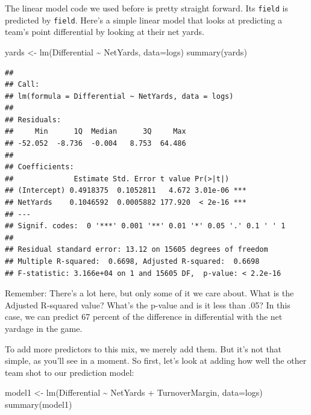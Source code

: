 \documentclass[
]{book}
\newenvironment{Shaded}{\begin{snugshade}}{\end{snugshade}}
\newcommand{\AttributeTok}[1]{\textcolor[rgb]{0.77,0.63,0.00}{#1}}
\newcommand{\FunctionTok}[1]{\textcolor[rgb]{0.00,0.00,0.00}{#1}}
\newcommand{\NormalTok}[1]{#1}
\newcommand{\OtherTok}[1]{\textcolor[rgb]{0.56,0.35,0.01}{#1}}
\newcommand{\SpecialCharTok}[1]{\textcolor[rgb]{0.00,0.00,0.00}{#1}}
\begin{document}
The linear model code we used before is pretty straight forward. Its \texttt{field} is predicted by \texttt{field}. Here's a simple linear model that looks at predicting a team's point differential by looking at their net yards.

\begin{Shaded}
\begin{Highlighting}[]
\NormalTok{yards }\OtherTok{\textless{}{-}} \FunctionTok{lm}\NormalTok{(Differential }\SpecialCharTok{\textasciitilde{}}\NormalTok{ NetYards, }\AttributeTok{data=}\NormalTok{logs)}
\FunctionTok{summary}\NormalTok{(yards)}
\end{Highlighting}
\end{Shaded}

\begin{verbatim}
## 
## Call:
## lm(formula = Differential ~ NetYards, data = logs)
## 
## Residuals:
##     Min      1Q  Median      3Q     Max 
## -52.052  -8.736  -0.004   8.753  64.486 
## 
## Coefficients:
##              Estimate Std. Error t value Pr(>|t|)    
## (Intercept) 0.4918375  0.1052811   4.672 3.01e-06 ***
## NetYards    0.1046592  0.0005882 177.920  < 2e-16 ***
## ---
## Signif. codes:  0 '***' 0.001 '**' 0.01 '*' 0.05 '.' 0.1 ' ' 1
## 
## Residual standard error: 13.12 on 15605 degrees of freedom
## Multiple R-squared:  0.6698, Adjusted R-squared:  0.6698 
## F-statistic: 3.166e+04 on 1 and 15605 DF,  p-value: < 2.2e-16
\end{verbatim}

Remember: There's a lot here, but only some of it we care about. What is the Adjusted R-squared value? What's the p-value and is it less than .05? In this case, we can predict 67 percent of the difference in differential with the net yardage in the game.

To add more predictors to this mix, we merely add them. But it's not that simple, as you'll see in a moment. So first, let's look at adding how well the other team shot to our prediction model:

\begin{Shaded}
\begin{Highlighting}[]
\NormalTok{model1 }\OtherTok{\textless{}{-}} \FunctionTok{lm}\NormalTok{(Differential }\SpecialCharTok{\textasciitilde{}}\NormalTok{ NetYards }\SpecialCharTok{+}\NormalTok{ TurnoverMargin, }\AttributeTok{data=}\NormalTok{logs)}
\FunctionTok{summary}\NormalTok{(model1)}
\end{Highlighting}
\end{Shaded}
\end{document}
